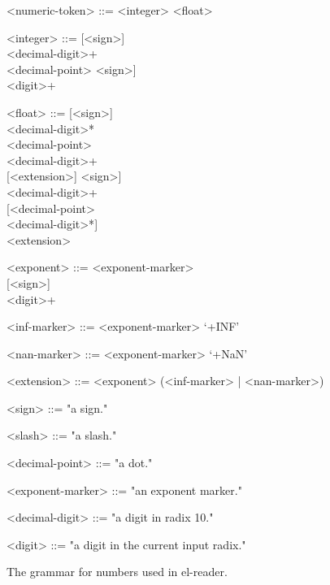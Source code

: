 \documentclass[a4paper,10pt,twoside]{report}
\newcommand{\elr}{el-reader}
\begin{document}
\begin{figure}
  \begin{grammar}
    <numeric-token> ::= <integer> \alt <float>
  
    <integer> ::= {[}<sign>{]} \\
    <decimal-digit>+ \\
    <decimal-point>
    \alt {[}<sign>{]} \\
    <digit>+
  
    <float> ::= {[}<sign>{]} \\
    <decimal-digit>* \\
    <decimal-point> \\
    <decimal-digit>+ \\
    {[}<extension>{]}
    \alt {[}<sign>{]} \\
    <decimal-digit>+ \\
    {[}<decimal-point> \\
    <decimal-digit>*{]} \\
    <extension>

    <exponent> ::= <exponent-marker> \\
    {[}<sign>{]} \\
    <digit>+

    <inf-marker> ::= <exponent-marker> `+INF'
  
    <nan-marker> ::= <exponent-marker> `+NaN'

    <extension> ::= <exponent>  (<inf-marker> |
    <nan-marker>)
                                       
    <sign> ::= "a sign."
  
    <slash> ::= "a slash."
  
    <decimal-point> ::= "a dot."
  
    <exponent-marker> ::= "an exponent marker."
  
    <decimal-digit> ::= "a digit in radix 10."
  
    <digit> ::= "a digit in the current input radix."
  \end{grammar}
  
  \caption[\elr{}s grammar]{The grammar for numbers used in \elr{}.}
  \label{fig:el-grammar}
\end{figure}
\end{document}
